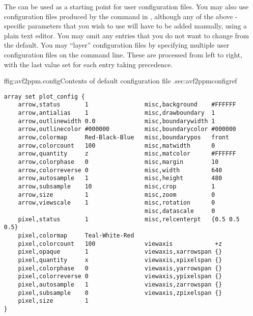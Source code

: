 The  can be used as a starting point for
user configuration files.  You may also use configuration files produced
by the  command in
, although any of the above
-specific parameters that you wish to use will have to be
added manually, using a plain text editor.  You may omit any entries
that you do not want to change from the default.  You may ``layer''
configuration files by specifying multiple user configuration files on
the command line.  These are processed from left to right, with the last
value set for each entry taking precedence.

\begin{codelisting}{f}{fig:avf2ppm.config}{Contents of default configuration
file .}{sec:avf2ppmconfig}{ref}
\begin{verbatim}
array set plot_config {
    arrow,status       1                misc,background    #FFFFFF
    arrow,antialias    1                misc,drawboundary  1
    arrow,outlinewidth 0.0              misc,boundarywidth 1
    arrow,outlinecolor #000000          misc,boundarycolor #000000
    arrow,colormap     Red-Black-Blue   misc,boundarypos   front
    arrow,colorcount   100              misc,matwidth      0
    arrow,quantity     z                misc,matcolor      #FFFFFF
    arrow,colorphase   0                misc,margin        10
    arrow,colorreverse 0                misc,width         640
    arrow,autosample   1                misc,height        480
    arrow,subsample    10               misc,crop          1
    arrow,size         1                misc,zoom          0
    arrow,viewscale    1                misc,rotation      0
                                        misc,datascale     0
    pixel,status       1                misc,relcenterpt   {0.5 0.5 0.5}
    pixel,colormap     Teal-White-Red
    pixel,colorcount   100              viewaxis            +z
    pixel,opaque       1                viewaxis,xarrowspan {}
    pixel,quantity     x                viewaxis,xpixelspan {}
    pixel,colorphase   0                viewaxis,yarrowspan {}
    pixel,colorreverse 0                viewaxis,ypixelspan {}
    pixel,autosample   1                viewaxis,zarrowspan {}
    pixel,subsample    0                viewaxis,zpixelspan {}
    pixel,size         1
}
\end{verbatim}
\end{codelisting}

